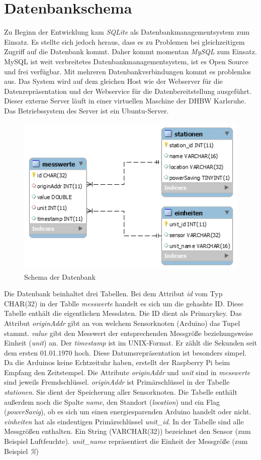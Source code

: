 \section{Datenbankschema}
Zu Beginn der Entwicklung kam \textit{SQLite} als Datenbankmanagementsystem zum Einsatz. Es stellte sich jedoch heraus, dass es zu Problemen bei gleichzeitigem Zugriff auf die Datenbank kommt. Daher kommt momentan \textit{MySQL} zum Einsatz. MySQL ist weit verbreitetes Datenbankmanagementsystem, ist es Open Source und frei verfügbar. Mit mehreren Datenbankverbindungen kommt es problemlos aus. Das System wird auf dem gleichen Host wie der Webserver für die Datenrepräsentation und der Webservice für die Datenbereitstellung ausgeführt. Dieser externe Server läuft in einer virtuellen Maschine der DHBW Karlsruhe. Das Betriebssystem des Server ist ein Ubuntu-Server. 
\begin{figure}[h!]
\includegraphics[scale=0.8]{bilder/EERDiagramm} 
\caption{Schema der Datenbank}
\label{Datenbankschema}
\end{figure}   
Die Datenbank beinhaltet drei Tabellen. Bei dem Attribut \textit{id} vom Typ CHAR(32) in der Tablle \textit{messwerte} handelt es sich um die gehashte ID. Diese Tabelle enthält die eigentlichen Messdaten. Die ID dient als Primarykey. Das Attribut \textit{originAddr} gibt an von welchem Sensorknoten (Arduino) das Tupel stammt. \textit{value} gibt den Messwert der entsprechenden Messgröße beziehungsweise Einheit (\textit{unit}) an. Der \textit{timestamp} ist im UNIX-Format. Er zählt die Sekunden seit dem ersten 01.01.1970 hoch. Diese Datumsrepräsentation ist besonders simpel. Da die Arduinos keine Echtzeituhr haben, erstellt der Raspberry Pi beim Empfang den Zeitstempel.
Die Attribute \textit{originAddr} und \textit{unit} sind in \textit{messwerte} sind jeweils Fremdschlüssel. \textit{originAddr} ist Primärschlüssel in der Tabelle \textit{stationen}. Sie dient der Speicherung aller Sensorknoten. Die Tabelle enthält außerdem noch die Spalte \textit{name}, den Standort (\textit{location}) und ein Flag (\textit{powerSavig}), ob es sich um einen energiesparenden Arduino handelt oder nicht.
\textit{einheiten} hat als eindeutigen Primärschlüssel \textit{unit\_id}. In der Tabelle sind alle Messgrößen enthalten. Ein String (VARCHAR(32)) bezeichnet den Sensor (zum Beispiel Luftfeuchte). \textit{unit\_name} repräsentiert die Einheit der Messgröße (zum Beispiel \textit{\%}) 
